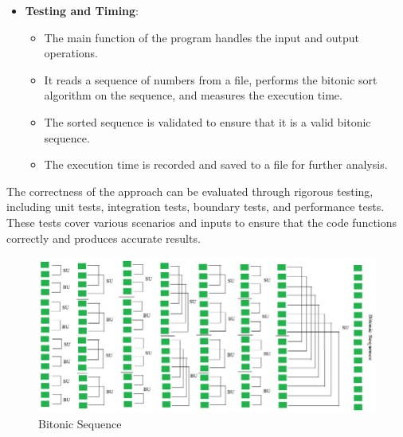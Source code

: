 \begin{itemize}
  \begin{center}
    \begin{algorithm}[H]
        
        
        \caption{Bitonic sort function}
    \end{algorithm}
\end{center}

\newpage
  
  \item \textbf{Testing and Timing}:
  \begin{itemize}
    \item The main function of the program handles the input and output operations.
    \item It reads a sequence of numbers from a file, performs the bitonic sort algorithm on the sequence, and measures the execution time.
    \item The sorted sequence is validated to ensure that it is a valid bitonic sequence.
    \item The execution time is recorded and saved to a file for further analysis.
  \end{itemize}
\end{itemize}

The correctness of the approach can be evaluated through rigorous testing, including unit tests, integration tests, boundary tests, and performance tests. These tests cover various scenarios and inputs to ensure that the code functions correctly and produces accurate results.

\begin{figure}[htb]
	\centering
	\includegraphics[width=0.8\linewidth]{pics/bitonicExample.png}
    	\caption{Bitonic Sequence}\label{fig:scanDownSweep}
\end{figure}

